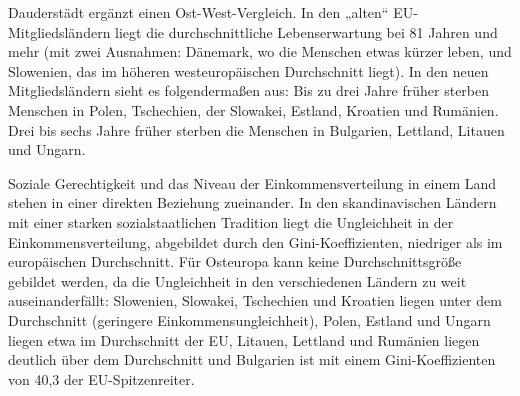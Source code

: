 \begin{multicols*}{2}
Dauderstädt ergänzt einen Ost-West-Vergleich. In den „alten“ EU-Mitgliedsländern liegt die durchschnittliche Lebenserwartung bei 81 Jahren und mehr (mit zwei Ausnahmen: Dänemark, wo die Menschen etwas kürzer leben, und Slowenien, das im höheren westeuropäischen Durchschnitt liegt). In den neuen Mitgliedsländern sieht es folgendermaßen aus: Bis zu drei Jahre früher sterben Menschen in Polen, Tschechien, der Slowakei, Estland, Kroatien und Rumänien. Drei bis sechs Jahre früher sterben die Menschen in Bulgarien, Lettland, Litauen und Ungarn.

Soziale Gerechtigkeit und das Niveau der Einkommensverteilung in einem Land stehen in einer direkten Beziehung zueinander. In den skandinavischen Ländern mit einer starken sozialstaatlichen Tradition liegt die Ungleichheit in der Einkommensverteilung, abgebildet durch den Gini-Koeffizienten, niedriger als im europäischen Durchschnitt. Für Osteuropa kann keine Durchschnittsgröße gebildet werden, da die Ungleichheit in den verschiedenen Ländern zu weit auseinanderfällt: Slowenien, Slowakei, Tschechien und Kroatien liegen unter dem Durchschnitt (geringere Einkommensungleichheit), Polen, Estland und Ungarn liegen etwa im Durchschnitt der EU, Litauen, Lettland und Rumänien liegen deutlich über dem Durchschnitt und Bulgarien ist mit einem Gini-Koeffizienten von 40,3 der EU-Spitzenreiter. 


\end{multicols*}
